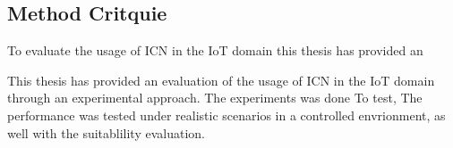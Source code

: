 \subsection{Method Critquie}
To evaluate the usage of ICN in the IoT domain this thesis has provided an

This thesis has provided an evaluation of the usage of ICN in the IoT domain through an experimental approach. The experiments was done
To test, 
The performance was tested under realistic scenarios in a controlled envrionment, as well with the suitablility evaluation.


